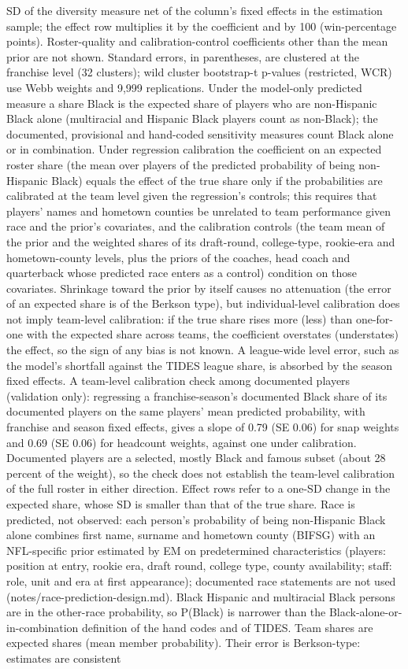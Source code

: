 {SD of the diversity measure net of the column's fixed effects in the estimation sample; the effect row multiplies it by the coefficient and by 100 (win-percentage points). Roster-quality and calibration-control coefficients other than the mean prior are not shown. Standard errors, in parentheses, are clustered at the franchise level (32 clusters); wild cluster bootstrap-t p-values (restricted, WCR) use Webb weights and 9,999 replications. Under the model-only predicted measure a share Black is the expected share of players who are non-Hispanic Black alone (multiracial and Hispanic Black players count as non-Black); the documented, provisional and hand-coded sensitivity measures count Black alone or in combination. Under regression calibration the coefficient on an expected roster share (the mean over players of the predicted probability of being non-Hispanic Black) equals the effect of the true share only if the probabilities are calibrated at the team level given the regression's controls; this requires that players' names and hometown counties be unrelated to team performance given race and the prior's covariates, and the calibration controls (the team mean of the prior and the weighted shares of its draft-round, college-type, rookie-era and hometown-county levels, plus the priors of the coaches, head coach and quarterback whose predicted race enters as a control) condition on those covariates. Shrinkage toward the prior by itself causes no attenuation (the error of an expected share is of the Berkson type), but individual-level calibration does not imply team-level calibration: if the true share rises more (less) than one-for-one with the expected share across teams, the coefficient overstates (understates) the effect, so the sign of any bias is not known. A league-wide level error, such as the model's shortfall against the TIDES league share, is absorbed by the season fixed effects. A team-level calibration check among documented players (validation only): regressing a franchise-season's documented Black share of its documented players on the same players' mean predicted probability, with franchise and season fixed effects, gives a slope of 0.79 (SE 0.06) for snap weights and  0.69 (SE 0.06) for headcount weights, against one under calibration. Documented players are a selected, mostly Black and famous subset (about 28 percent of the weight), so the check does not establish the team-level calibration of the full roster in either direction. Effect rows refer to a one-SD change in the expected share, whose SD is smaller than that of the true share. Race is predicted, not observed: each person's probability of being non-Hispanic Black alone combines first name, surname and hometown county (BIFSG) with an NFL-specific prior estimated by EM on predetermined characteristics (players: position at entry, rookie era, draft round, college type, county availability; staff: role, unit and era at first appearance); documented race statements are not used (notes/race-prediction-design.md). Black Hispanic and multiracial Black persons are in the other-race probability, so P(Black) is narrower than the Black-alone-or-in-combination definition of the hand codes and of TIDES. Team shares are expected shares (mean member probability). Their error is Berkson-type: estimates are consistent }
